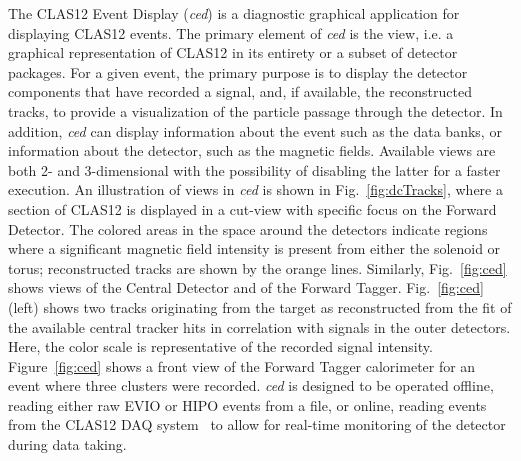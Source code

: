 The CLAS12 Event Display ({\it ced}) is a diagnostic graphical application for displaying CLAS12 events. The
primary element of {\it ced} is the view, i.e. a graphical representation of CLAS12 in its entirety or a subset of
detector packages. For a given event, the primary purpose is to display the detector components that have recorded
a signal, and, if available, the reconstructed tracks, to provide a visualization of the particle passage through the
detector. In addition, {\it ced} can display information about the event such as the data banks, or information about
the detector, such as the magnetic fields. Available views are both 2- and 3-dimensional with the possibility of
disabling the latter for a faster execution. An illustration of views in {\it ced} is shown in Fig.~\ref{fig:dcTracks},
where a section of CLAS12 is displayed in a cut-view with specific focus on the Forward Detector. The colored areas
in the space around the detectors indicate regions where a significant magnetic field intensity is present from either
the solenoid or torus; reconstructed tracks are shown by the orange lines. Similarly, Fig.~\ref{fig:ced} shows views
of the Central Detector and of the Forward Tagger. Fig.~\ref{fig:ced}(left) shows two tracks originating from the
target as reconstructed from the fit of the available central tracker hits in correlation with signals in the outer
detectors. Here, the color scale is representative of the recorded signal intensity. Figure~\ref{fig:ced} shows a
front view of the Forward Tagger calorimeter for an event where three clusters were recorded. {\it ced} is
designed to be operated offline, reading either raw EVIO or HIPO events from a file, or online, reading events
from the CLAS12 DAQ system~\cite{daq-nim} to allow for real-time monitoring of the detector during data taking.

